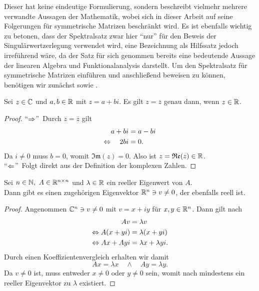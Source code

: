 Dieser hat keine eindeutige Formulierung, sondern beschreibt vielmehr mehrere verwandte Aussagen der Mathematik, wobei sich in dieser Arbeit auf seine Folgerungen für symmetrische Matrizen beschränkt wird.
Es ist ebenfalls wichtig zu betonen, dass der Spektralsatz zwar hier \enquote{nur} für den Beweis der Singulärwertzerlegung verwendet wird, eine Bezeichnung als Hilfssatz jedoch irreführend wäre, da der Satz für sich genommen bereits eine bedeutende Aussage der linearen Algebra und Funktionalanalysis darstellt.
Um den Spektralsatz für symmetrische Matrizen einführen und anschließend beweisen zu können, benötigen wir zunächst  sowie .
\begin{lemma}\label{complex}
    Sei \(z \in \mathbb{C}\) und \(a,b \in \mathbb{R}\) mit \(z = a + bi\). 
    Es gilt \(z = \overline{z}\) genau dann, wenn \(z \in \mathbb{R}\).     
\end{lemma}
\begin{proof}
    \enquote{\(\Rightarrow\)}\ Durch \(z = \overline{z}\) gilt
    \begin{align*}
        a + bi &= a -bi\\
        \Leftrightarrow \quad 2bi &= 0.
    \end{align*}
    Da \(i \neq 0\) muss \(b = 0\), womit \(\mathfrak{Im}(z) = 0\). Also ist \(z = \mathfrak{Re}(z) \in \mathbb{R}\).\\
    \enquote{\(\Leftarrow\)}\ Folgt direkt aus der Definition der komplexen Zahlen.  
\end{proof}
\begin{lemma}\label{lm:realeig} 
    Sei \(n \in \mathbb{N},\ A \in \mathbb{R}^{n \times n} \) und \(\lambda \in \mathbb{R}\) ein reeller Eigenwert von \(A\).\\
    Dann gibt es einen zugehörigen Eigenvektor \(\mathbb{R}^{n} \ni v \neq 0\), der ebenfalls reell ist.     
\end{lemma}
\begin{proof}
    Angenommen \(\mathbb{C}^{n} \ni v \neq 0\) mit \(v = x+iy\) für \(x,y \in \mathbb{R}^{n}\).
    Dann gilt nach 
    \begin{align*}
        Av &= \lambda v \\
        \Leftrightarrow A(x+yi) &= \lambda(x+yi) \\ 
        \Leftrightarrow Ax + Ayi &= \lambda x + \lambda yi.
    \end{align*}        
    Durch einen Koeffizientenvergleich erhalten wir damit
    \begin{equation*}
        Ax = \lambda x \quad \wedge \quad Ay = \lambda y.
    \end{equation*}
    Da \(v \neq 0\) ist, muss entweder \(x \neq 0\) oder \(y \neq 0\) sein, womit nach  mindestens ein reeller Eigenvektor zu \(\lambda\) existiert.
\end{proof}
